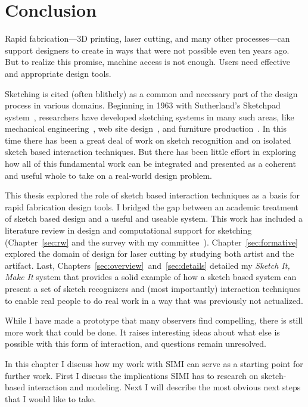 \chapter{Conclusion}

Rapid fabrication---3D printing, laser cutting, and many other
processes---can support designers to create in ways that were not
possible even ten years ago. But to realize this promise, machine
access is not enough. Users need effective and appropriate design
tools.

Sketching is cited (often blithely) as a common and necessary part of
the design process in various domains. Beginning in 1963 with
Sutherland's Sketchpad system~\cite{sutherland-sketchpad}, researchers
have developed sketching systems in many such areas, like mechanical
engineering~\cite{lipson-correlation}, web site
design~\cite{lin-denim}, and furniture
production~\cite{oh-fab,saul-sketch-chair}. In this time there has
been a great deal of work on sketch recognition and on isolated sketch
based interaction techniques. But there has been little effort in
exploring how all of this fundamental work can be integrated and
presented as a coherent and useful whole to take on a real-world
design problem.

This thesis explored the role of sketch based interaction techniques
as a basis for rapid fabrication design tools. I bridged the gap
between an academic treatment of sketch based design and a useful and
useable system. This work has included a literature review in design
and computational support for sketching (Chapter~\ref{sec:rw} and the
survey with my
committee~\cite{johnson-sketch-review}). Chapter~\ref{sec:formative}
explored the domain of design for laser cutting by studying both
artist and the artifact. Last,
Chapters~\ref{sec:overview}~and~\ref{sec:details} detailed my
\textit{Sketch It, Make It} system that provides a solid example of
how a sketch based system can present a set of sketch recognizers and
(most importantly) interaction techniques to enable real people to do
real work in a way that was previously not actualized.

While I have made a prototype that many observers find compelling,
there is still more work that could be done. It raises interesting
ideas about what else is possible with this form of interaction,
and questions remain unresolved.

In this chapter I discuss how my work with SIMI can serve as a
starting point for further work. First I discuss the implications SIMI
has to research on sketch-based interaction and modeling. Next I will
describe the most obvious next steps that I would like to take.

